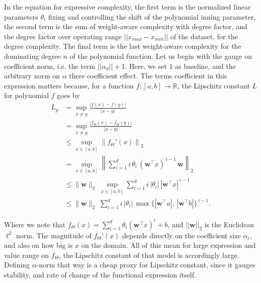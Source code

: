 \documentclass[
  journal=largetwo,
  year=2025,
  volume=37,
]{cup-journal}
\begin{document}
In the equation for expressive complexity, the first term is the normalized linear parameters $\theta_{i}$ fixing and controlling the shift of the polynomial inning parameter, the second term is the sum of weight-aware complexity with degree factor, and the degree factor over operating range $||x_{max}-x_{min}||$ of the dataset, for the degree complexity. The final term is the last weight-aware complexity for the dominating degree $n$ of the polynomial function. Let us begin with the gauge on coefficient norm, i.e. the term $||\alpha_{d}||+1$. Here, we set $1$ as baseline, and the arbitrary norm on $\alpha$ there coefficient effect. The terms coefficient in this expression matters because, for a function $f:[a,b]\to\mathbb{R}$, the Lipschitz constant $L$ for polynomial $f$ goes by 
\begin{align}
L_{p} 
&= \sup_{x \neq y} \frac{|f(x) - f(y)|}{|x - y|} \\
&= \sup_{x \neq y} \frac{|f_{\Theta}(x) - f_{\Theta}(y)|}{|x - y|} \\
&\leq \sup_{x \in [a,b]} \left\lVert f_{\Theta}'(x) \right\rVert_{2} \\
&= \sup_{x \in [a,b]} \left\lVert \sum_{i=1}^{d} i\,\theta_i\,(\mathbf{w}^\top x)^{\,i-1}\,\mathbf{w} \right\rVert_{2} \\
&\le \lVert \mathbf{w} \rVert_{2}\; \sup_{x \in [a,b]} \sum_{i=1}^{d} i\,|\theta_i|\,|\mathbf{w}^\top x|^{\,i-1} \\
&\le \lVert \mathbf{w} \rVert_{2}\; \sum_{i=1}^{d} i\,|\theta_i|\,\max\!\big\{ |\mathbf{w}^\top a|,\,|\mathbf{w}^\top b| \big\}^{\,i-1}.
\end{align}


Where we note that $f_{\Theta}(x)=\sum_{i=1}^{d} \theta_i \left( \mathbf{w}^\top x \right)^i + b$, and $||\mathbf{w}||_{2}$ is the Euclidean $\ell^{2}$ norm. The magnitude of $f_{\Theta}'(x)$ depends directly on the coefficient size $\alpha_{i}$, and also on how big is $x$ on the domain. All of this mean for large expression and value range on $f_{\Theta}$, the Lipschitz constant of that model is accordingly large. Defining $\alpha$-norm that way is a cheap proxy for Lipschitz constant, since it gauges stability, and rate of change of the functional expression itself. 
\end{document}
